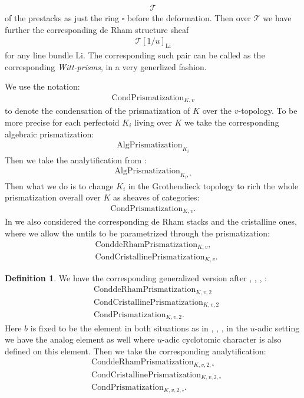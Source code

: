 \documentclass[12pt]{article}
\theoremstyle{definition}
\newtheorem{definition}{Definition}
\begin{document}
 \begin{align}
 \mathcal{T}
 \end{align}
 of the prestacks as just the ring $\square$ before the deformation. Then over $\mathcal{T}$ we have further the corresponding de Rham structure sheaf 
 \begin{align}
 \mathcal{T}[1/u]_{\mathrm{Li}}
  \end{align}
 for any line bundle $\mathrm{Li}$. The corresponding such pair can be called as the corresponding \textit{Witt-prisms}, in a very generlized fashion.
 
 
 
 
 
 We use the notation:
\begin{align}
\mathrm{CondPrismatization}_{K,v}
\end{align}
to denote the condensation of the prismatization of $K$ over the $v$-topology. To be more precise for each perfectoid $K_i$ living over $K$ we take the corresponding algebraic prismatization:
\begin{align}
\mathrm{AlgPrismatization}_{K_i}
\end{align}
Then we take the analytification from \cite{1CS}:
\begin{align}
\mathrm{AlgPrismatization}_{K_i,\square}
\end{align}
Then what we do is to change $K_i$ in the Grothendieck topology to rich the whole prismatization overall over $K$ as sheaves of categories:
\begin{align}
\mathrm{CondPrismatization}_{K,v}.
\end{align}
In \cite{1To1} we also considered the corresponding de Rham stacks and the cristalline ones, where we allow the untils to be parametrized through the prismatization:
\begin{align}
&\mathrm{ConddeRhamPrismatization}_{K,v},\\
&\mathrm{CondCristallinePrismatization}_{K,v}.
\end{align}


\begin{definition}
We have the corresponding generalized version after \cite{1BS1}, \cite{1F2}, \cite{1BL1}, \cite{1BL2}:
\begin{align}
&\mathrm{ConddeRhamPrismatization}_{K,v,2}\\
&\mathrm{CondCristallinePrismatization}_{K,v,2}\\
&\mathrm{CondPrismatization}_{K,v,2}.
\end{align}
Here $b$ is fixed to be the element in both situations as in \cite{1BL1}, \cite{1BL2}, \cite{1BS1}, in the $u$-adic setting we have the analog element as well where $u$-adic cyclotomic character is also defined on this element. Then we take the corresponding analytification:
 \begin{align}
&\mathrm{ConddeRhamPrismatization}_{K,v,2,\square}\\
&\mathrm{CondCristallinePrismatization}_{K,v,2,\square}\\
&\mathrm{CondPrismatization}_{K,v,2,\square}.
\end{align}
\end{definition}
\end{document}

